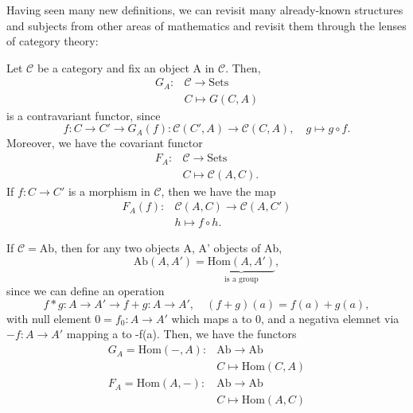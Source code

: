 \documentclass[../category_theory.tex]{subfiles}
\begin{document}
Having seen many new definitions, we can revisit many already-known structures and subjects from other areas of mathematics and revisit them through the lenses of category theory:
\begin{example}
	Let \(\mathcal{C}\) be a category and fix an object A in \(\mathcal{C}\). Then,
	\begin{align*}
		G_{A}: & \mathcal{C}\rightarrow \mathrm{Sets} \\
		       & C\mapsto G(C, A)
	\end{align*}
	is a contravariant functor, since
	\[
		f:C\rightarrow C' \longrightarrow G_{A}(f):\mathcal{C}(C', A)\rightarrow \mathcal{C}(C, A),\quad g\mapsto g\circ f.
	\]
	Moreover, we have the covariant functor
	\begin{align*}
		F_{A}: & \mathcal{C}\rightarrow \mathrm{Sets} \\
		       & C\mapsto \mathcal{C}(A, C).
	\end{align*}
	If \(f:C\rightarrow C'\) is a morphism in \(\mathcal{C}\), then we have the map
	\begin{align*}
		F_{A}(f): & \mathcal{C}(A, C)\rightarrow \mathcal{C}(A, C') \\
		          & h\mapsto f \circ h.
	\end{align*}
\end{example}
\begin{example}
	If \(\mathcal{C}=\mathrm{Ab}\), then for any two objects A, A' objects of Ab,
	\[
		\mathrm{Ab}(A, A')=\underbrace{\mathrm{Hom}(A, A')}_{\text{is a group}},
	\]
	since we can define an operation
	\[
		f*g:A\rightarrow A'\longrightarrow f+g:A\rightarrow A',\quad (f+g)(a)=f(a)+g(a),
	\]
	with null element \(0=f_{0}:A\rightarrow A'\) which maps a to 0, and a negativa elemnet via \(-f:A\rightarrow A'\) mapping a to -f(a). Then, we have the functors
	\begin{align*}
		G_{A}=\mathrm{Hom}(-, A): & \mathrm{Ab}\rightarrow \mathrm{Ab} \\
		                          & C\mapsto \mathrm{Hom}(C, A)        \\
		F_{A}=\mathrm{Hom}(A, -): & \mathrm{Ab}\rightarrow \mathrm{Ab} \\
		                          & C\mapsto \mathrm{Hom}(A, C)        \\
	\end{align*}
\end{example}
\end{document}
